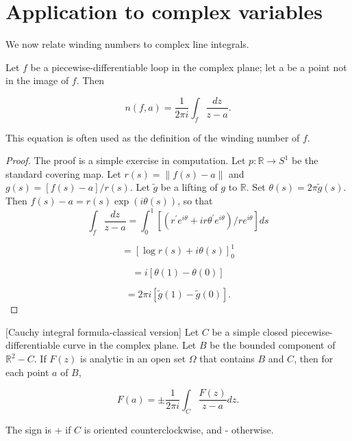 \section*{Application to complex variables}

We now relate winding numbers to complex line integrals.

\begin{lemma}
\label{lem:\thetheorem}
Let \(f\) be a piecewise-differentiable loop in the complex plane; let a be a point not in the image of \(f\). Then

\[
n( {f,a}) = \frac{1}{2\pi i}{\int }_{f}\frac{dz}{z - a}.
\]

This equation is often used as the definition of the winding number of \(f\).
\end{lemma}

\begin{proof}
The proof is a simple exercise in computation. Let \(p : \mathbb{R} \rightarrow {S}^{1}\) be the standard covering map. Let \(r( s) = \parallel f( s) - a\parallel\) and \(g( s) = [ {f( s) - a}] /r( s)\). Let \(\tilde{g}\) be a lifting of \(g\) to \(\mathbb{R}\). Set \(\theta ( s) = {2\pi }\tilde{g}( s)\). Then \(f( s) - a = r( s) \exp ( {{i\theta }( s) })\), so that
\[
{\int }_{f}\frac{dz}{z - a} = {\int }_0^{1}[ {( {r^{\prime }e^{i\theta } + {ir}{\theta }^{\prime }e^{i\theta }}) /re^{i\theta }}] {ds}
\]

\[
= {[ \log r( s) + i\theta ( s) ] }_0^{1}
\]

\[
= i[ {\theta (1) - \theta ( 0) }]
\]

\[
= {2\pi i}[ {\tilde{g}(1) - \tilde{g}( 0) }] .
\]
\end{proof}
\begin{theorem}
\label{thm:\thetheorem}[Cauchy integral formula-classical version]
Let \(C\) be a simple closed piecewise-differentiable curve in the complex plane. Let \(B\) be the bounded component of \(\mathbb{R}^{2} - C\). If \(F( z)\) is analytic in an open set \(\Omega\) that contains \(B\) and \(C\), then for each point \(a\) of \(B\),

\[
F( a) = \pm \frac{1}{2\pi i}{\int }_{C}\frac{F( z) }{z - a}{dz}.
\]

The sign is + if \(C\) is oriented counterclockwise, and - otherwise.
\end{theorem}

